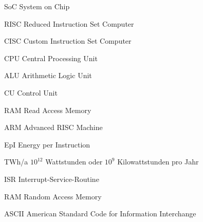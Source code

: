 \begin{abkuerzungen}[MUSTER] %
\item[SoC] System on Chip
\item[RISC] Reduced Instruction Set Computer
\item[CISC] Custom Instruction Set Computer
\item[CPU] Central Processing Unit
\item[ALU] Arithmetic Logic Unit
\item[CU] Control Unit
\item[RAM] Read Access Memory
\item[ARM] Advanced RISC Machine
\item[EpI] Energy per Instruction
\item[TWh/a] $10^{12}$ Wattstunden oder $10^{9}$ Kilowattstunden pro Jahr
\item[ISR] Interrupt-Service-Routine
\item[RAM] Random Access Memory
\item[ASCII] American Standard Code for Information Interchange

\end{abkuerzungen}
